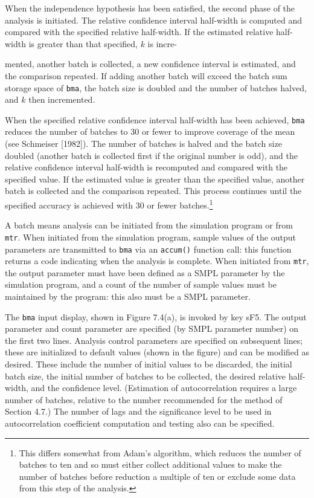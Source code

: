 When the independence hypothesis has been satisfied, the second phase
of the analysis is initiated. The relative confidence interval half-width is
computed and compared with the specified relative half-width. If the
estimated relative half-width is greater than that specified, $k$ is incre-

\noindent mented,
another batch is collected, a new confidence interval is estimated,
and the comparison repeated. If adding another batch will exceed the batch
sum storage space of \texttt{bma}, the batch size is doubled and the number of batches
halved, and $k$ then incremented.

When the specified relative confidence interval half-width has been
achieved, \texttt{bma} reduces the number of batches to 30 or fewer to improve
coverage of the mean (see Schmeiser [1982]). The number of batches is
halved and the batch size doubled (another batch is collected first if the
original number is odd), and the relative confidence interval half-width is
recomputed and compared with the specified value. If the estimated value
is greater than the specified value, another batch is collected and the
comparison repeated. This process continues until the specified accuracy is
achieved with 30 or fewer batches.\footnote{This differs somewhat from Adam's algorithm, which reduces the number of batches to ten and so must either collect additional values to make the number of batches before reduction a multiple of ten or exclude some data from this step of the analysis.}

A batch means analysis can be initiated from the simulation program or
from \texttt{mtr}. When initiated from the simulation program, sample values of
the output parameters are transmitted to \texttt{bma} via an \texttt{accum()} function call:
this function returns a code indicating when the analysis is complete. When
initiated from \texttt{mtr}, the output parameter must have been defined as a SMPL
parameter by the simulation program, and a count of the number of sample
values must be maintained by the program: this also must be a SMPL
parameter.

The \texttt{bma} input display, shown in Figure 7.4(a), is invoked by key sF5.
The output parameter and count parameter are specified (by SMPL parameter
number) on the first two lines. Analysis control parameters are specified
on subsequent lines; these are initialized to default values (shown in the
figure) and can be modified as desired. These include the number of initial
values to be discarded, the initial batch size, the initial number of batches
to be collected, the desired relative half-width, and the confidence level.
(Estimation of autocorrelation requires a large number of batches, relative to
the number recommended for the method of Section 4.7.) The number of lags
and the significance level to be used in autocorrelation coefficient computation
and testing also can be specified.

